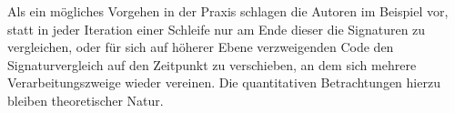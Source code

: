 \documentclass[11pt]{article}
\begin{document}
Als ein mögliches Vorgehen in der Praxis schlagen die Autoren im Beispiel vor,
statt in jeder Iteration einer Schleife nur am Ende dieser die Signaturen zu
vergleichen, oder für sich auf höherer Ebene verzweigenden Code den
Signaturvergleich auf den Zeitpunkt zu verschieben, an dem sich mehrere
Verarbeitungszweige wieder vereinen. Die quantitativen Betrachtungen hierzu
bleiben theoretischer Natur.


\pagebreak


\end{document}
